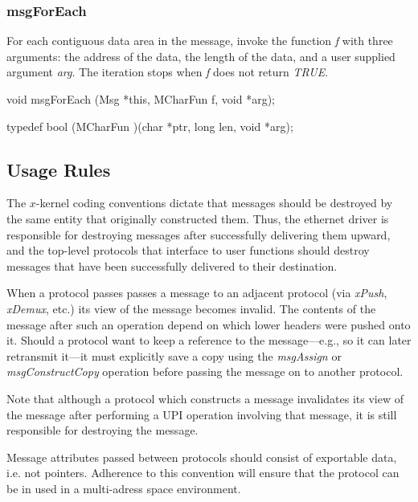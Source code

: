 \subsubsection{msgForEach}

For each contiguous data area in the message, invoke the function {\em
f} with three arguments: the address of the data, the length of the
data, and a user supplied argument {\em arg}.  The iteration stops
when {\em f} does not return {\em TRUE}.
\medskip

{\sem void} {\bold msgForEach} ({\sem Msg} *{\caps this}, {\sem MCharFun} {\caps f}, {\sem void} *{\caps arg});
\medskip

{\sem typedef} {\sem  bool}  ({\bold *MCharFun} )({\sem char} *{\caps ptr}, {\sem long} {\caps len}, {\sem void} *{\caps arg});\\

\subsection{Usage Rules}

The $x$-kernel coding conventions dictate that messages should be
destroyed by the same entity that originally constructed them.  Thus,
the ethernet driver is responsible for destroying messages after
successfully delivering them upward, and the top-level protocols that
interface to user functions should destroy messages that have been
successfully delivered to their destination.

When a protocol passes
passes a message to an adjacent protocol (via {\em xPush}, {\em
xDemux}, etc.) its view of the message becomes invalid.
The contents of the message after such an operation depend on
which lower headers were pushed onto it.  Should a protocol want to
keep a reference to the message---e.g., so it can later retransmit
it---it must explicitly save a copy using the {\em msgAssign} or {\em
msgConstructCopy} operation before passing the message on to another
protocol.

Note that although a protocol which constructs a message invalidates
its view of the message after performing a UPI operation involving
that message, it is still responsible for destroying the message. 

Message attributes passed between protocols should consist of
exportable data, i.e. not pointers.  Adherence to this convention will
ensure that the protocol can be in used in a multi-adress space
environment.
